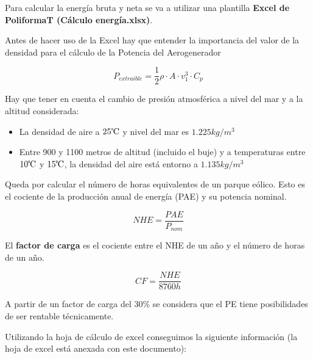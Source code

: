 \documentclass[12pt]{article}
\begin{document}
Para calcular la energía bruta y neta se va a utilizar una plantilla \textbf{Excel de PoliformaT (Cálculo energía.xlsx)}. \medskip

Antes de hacer uso de la Excel hay que entender la importancia del valor de la densidad para el cálculo de la Potencia del Aerogenerador

\[ P_{extraible} = \frac{1}{2} \rho \cdot A \cdot v_1^3 \cdot C_p \]

Hay que tener en cuenta el cambio de presión atmosférica a nivel del mar y a la altitud considerada:

\begin{itemize}
    \item La densidad de aire a $25\celsius$ y nivel del mar es $1.225 \unit{kg/m^3}$
    \item Entre 900 y 1100 metros de altitud (incluido el buje) y a temperaturas entre $10\celsius$ y $15 \celsius$, la densidad del aire está entorno a $1.135 \unit{kg/m^3}$
\end{itemize}

Queda por calcular el número de horas equivalentes de un parque eólico. Esto es el cociente de la producción anual de energía (PAE) y su potencia nominal.

\begin{equation}
    NHE = \frac{PAE}{P_{nom}}
\end{equation}

El \textbf{factor de carga} es el cociente entre el NHE de un año y el número de horas de un año.

\begin{equation}
    CF = \frac{NHE}{8760 \unit{h}}
\end{equation}

A partir de un factor de carga del 30\% se considera que el PE tiene posibilidades de ser rentable técnicamente. \medskip

Utilizando la hoja de cálculo de excel conseguimos la siguiente información (la hoja de excel está anexada con este documento):
\end{document}
